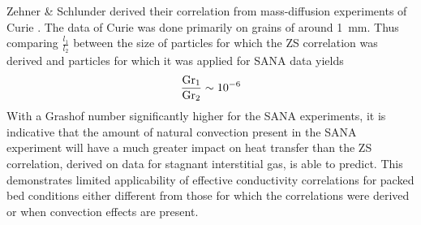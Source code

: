 Zehner \& Schlunder derived their correlation from mass-diffusion experiments of Curie \cite{Currie2002}. The data of Curie was done primarily on grains of around \SI{1}{\milli\meter}. Thus comparing $\frac{l_1}{l_2}$ between the size of particles for which the ZS correlation was derived and particles for which it was applied for SANA data yields
\begin{equation}
    \frac{\mathrm{Gr}_1}{\mathrm{Gr}_2} \sim 10^{-6}
\end{equation}
With a Grashof number significantly higher for the SANA experiments, it is indicative that the amount of natural convection present in the SANA experiment will have a much greater impact on heat transfer than the ZS correlation, derived on data for stagnant interstitial gas, is able to predict. This demonstrates limited applicability of effective conductivity correlations for packed bed conditions either different from those for which the correlations were derived or when convection effects are present. 

